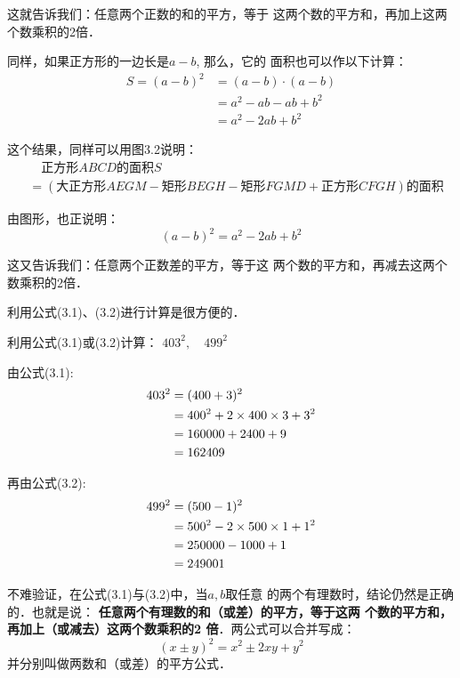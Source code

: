 这就告诉我们：任意两个正数的和的平方，等于
这两个数的平方和，再加上这两个数乘积的2倍．

同样，如果正方形的一边长是$a-b$, 那么，它的
面积也可以作以下计算：
\[\begin{split}
  S=(a-b)^2 &= ( a-b)\cdot (a-b)\\
  &=a^2-ab-ab+b^2\\
  &=a^2-2ab+b^2
\end{split}\]



这个结果，同样可以用图3.2说明：
\[\begin{split}
 & \quad \text{正方形$ABCD$的面积$S$}\\
 &=(\text{大正方形}AEGM-\text{矩形}BEGH-\text{矩形}FGMD+\text{正方形}CFGH)\text{的面积}
\end{split}\]

由图形，也正说明：
\begin{equation}
    (a-b)^2=a^2-2ab+b^2
\end{equation}

这又告诉我们：任意两个正数差的平方，等于这
两个数的平方和，再减去这两个数乘积的2倍．

利用公式(3.1)、(3.2)进行计算是很方便的．

\begin{example}
利用公式(3.1)或(3.2)计算：
$403^2,\quad 499^2$
\end{example}

\begin{solution}
    由公式(3.1):
    \[\begin{split}
        403^2&=(400+3)^2\\
    &=400^2+2\times400\times3+3^2\\
    &=160000+2400+9\\
    &=162409
    \end{split}\]
    
    再由公式(3.2):
    \[\begin{split}
         499^2&=(500-1)^2\\
         &=500^2-2\times500\times1+1^2\\
         &=250000-1000+1\\
         &=249001   
    \end{split}\]
\end{solution}  

不难验证，在公式(3.1)与(3.2)中，当$a,b$取任意
的两个有理数时，结论仍然是正确的．也就是说：
\textbf{任意两个有理数的和（或差）的平方，等于这两
个数的平方和，再加上（或减去）这两个数乘积的2
倍}．两公式可以合并写成：
\[(x\pm y)^2=x^2\pm 2xy+y^2\]
并分别叫做两数和（或差）的平方公式．

